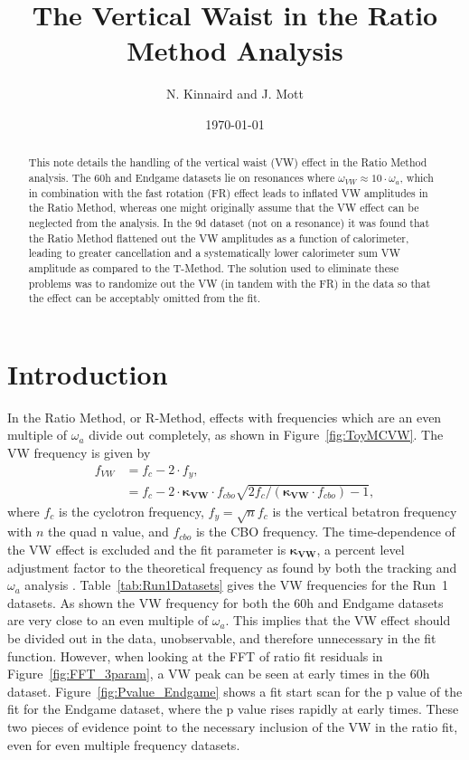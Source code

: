 \documentclass[12pt,letterpaper]{article}
\title{The Vertical Waist in the Ratio Method Analysis}
\author{N. Kinnaird and J. Mott}
\date{\today}
\newcommand{\figref}[1]{Figure~\ref{#1}}
\def\wa{$\omega_{a}$\xspace}
\begin{document}
\maketitle

\begin{abstract}
This note details the handling of the vertical waist (VW) effect in the Ratio Method analysis. The 60h and Endgame datasets lie on resonances where $\omega_{VW} \approx 10 \cdot \omega_{a}$, which in combination with the fast rotation (FR) effect leads to inflated VW amplitudes in the Ratio Method, whereas one might originally assume that the VW effect can be neglected from the analysis. In the 9d dataset (not on a resonance) it was found that the Ratio Method flattened out the VW amplitudes as a function of calorimeter, leading to greater cancellation and a systematically lower calorimeter sum VW amplitude as compared to the T-Method. The solution used to eliminate these problems was to randomize out the VW (in tandem with the FR) in the data so that the effect can be acceptably omitted from the fit.
\end{abstract}


\section{Introduction}

In the Ratio Method, or R-Method, effects with frequencies which are an even multiple of \wa divide out completely, as shown in \figref{fig:ToyMCVW}. The VW frequency is given by
    \begin{align} \label{eq:VWfreqKappa}
        f_{VW} &= f_{c} - 2 \cdot f_{y}, \\
               &= f_{c} - 2 \cdot \boldsymbol{\kappa_{VW}} \cdot f_{cbo}\sqrt{2f_{c}/(\boldsymbol{\kappa_{VW}} \cdot f_{cbo})-1},
    \end{align}
where $f_{c}$ is the cyclotron frequency, $f_{y} = \sqrt{n}f_{c}$ is the vertical betatron frequency with $n$ the quad n value, and $f_{cbo}$ is the CBO frequency. The time-dependence of the VW effect is excluded and the fit parameter is $\boldsymbol{\kappa_{VW}}$, a percent level adjustment factor to the theoretical frequency as found by both the tracking and \wa analysis \cite{cbofrequency}. Table~\ref{tab:Run1Datasets} gives the VW frequencies for the Run~1 datasets. As shown the VW frequency for both the 60h and Endgame datasets are very close to an even multiple of \wa. This implies that the VW effect should be divided out in the data, unobservable, and therefore unnecessary in the fit function. However, when looking at the FFT of ratio fit residuals in \figref{fig:FFT_3param}, a VW peak can be seen at early times in the 60h dataset. \figref{fig:Pvalue_Endgame} shows a fit start scan for the p value of the fit for the Endgame dataset, where the p value rises rapidly at early times. These two pieces of evidence point to the necessary inclusion of the VW in the ratio fit, even for even multiple frequency datasets.
\end{document}
